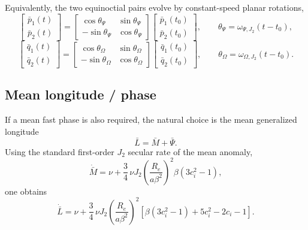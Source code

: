 \documentclass[11pt]{article}
\begin{document}
Equivalently, the two equinoctial pairs evolve by constant-speed planar
rotations,
\begin{equation}
\begin{bmatrix}
\bar p_1(t) \\
\bar p_2(t)
\end{bmatrix}
=
\begin{bmatrix}
\cos\theta_\Psi & \sin\theta_\Psi \\
-\sin\theta_\Psi & \cos\theta_\Psi
\end{bmatrix}
\begin{bmatrix}
\bar p_1(t_0) \\
\bar p_2(t_0)
\end{bmatrix},
\qquad
\theta_\Psi = \omega_{\Psi,J_2}(t-t_0),
\end{equation}
\begin{equation}
\begin{bmatrix}
\bar q_1(t) \\
\bar q_2(t)
\end{bmatrix}
=
\begin{bmatrix}
\cos\theta_\Omega & \sin\theta_\Omega \\
-\sin\theta_\Omega & \cos\theta_\Omega
\end{bmatrix}
\begin{bmatrix}
\bar q_1(t_0) \\
\bar q_2(t_0)
\end{bmatrix},
\qquad
\theta_\Omega = \omega_{\Omega,J_2}(t-t_0).
\end{equation}

\subsection{Mean longitude / phase}

If a mean fast phase is also required, the natural choice is the mean
generalized longitude
\begin{equation}
\bar L = \bar M + \bar\Psi.
\end{equation}
Using the standard first-order $J_2$ secular rate of the mean anomaly,
\begin{equation}
\dot{\bar M}
= \nu
+ \frac{3}{4}\,\nu J_2
\left(\frac{R_e}{a\beta^2}\right)^2
\beta\left(3c_i^2-1\right),
\label{eq:MdotJ2}
\end{equation}
one obtains
\begin{equation}
\dot{\bar L}
= \nu
+ \frac{3}{4}\,\nu J_2
\left(\frac{R_e}{a\beta^2}\right)^2
\left[
\beta(3c_i^2-1)
+ 5c_i^2 - 2c_i - 1
\right].
\label{eq:Lbar_J2}
\end{equation}
\end{document}
